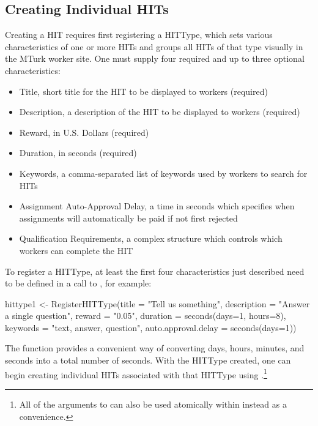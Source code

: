 \subsection{Creating Individual HITs}
Creating a HIT requires first registering a HITType, which sets various characteristics of one or more HITs and groups all HITs of that type visually in the MTurk worker site. One must supply four required and up to three optional characteristics:

\begin{itemize}
\item Title, short title for the HIT to be displayed to workers (required)
\item Description, a description of the HIT to be displayed to workers (required)
\item Reward, in U.S. Dollars (required)
\item Duration, in seconds (required)
\item Keywords, a comma-separated list of keywords used by workers to search for HITs
\item Assignment Auto-Approval Delay, a time in seconds which specifies when assignments will automatically be paid if not first rejected
\item Qualification Requirements, a complex structure which controls which workers can complete the HIT
\end{itemize}

To register a HITType, at least the first four characteristics just described need to be defined in a call to , for example:

\begin{example}
hittype1 <- RegisterHITType(title = "Tell us something", 
                            description = "Answer a single question", 
                            reward = "0.05", 
                            duration = seconds(days=1, hours=8), 
                            keywords = "text, answer, question", 
                            auto.approval.delay = seconds(days=1))
\end{example}

The  function provides a convenient way of converting days, hours, minutes, and seconds into a total number of seconds. With the HITType created, one can begin creating individual HITs associated with that HITType using .\footnote{All of the arguments to  can also be used atomically within  instead as a convenience.}

